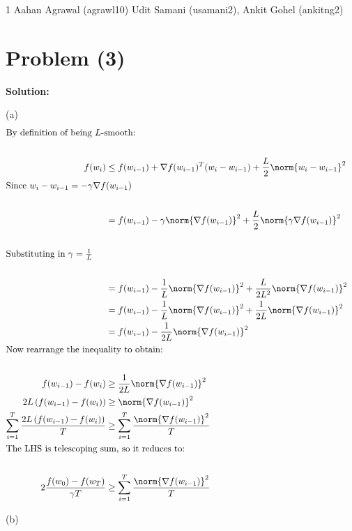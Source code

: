 \documentclass[../main.tex]{subfiles}
\begin{document}
\homework
    {1}
    {Aahan Agrawal (agrawl10)}
    {Udit Samani (usamani2), Ankit Gohel (ankitng2)}

\section*{Problem (3)}
\textbf{Solution:} 

(a) \\
\begin{align*}
    \intertext{By definition of being $L$-smooth:} \\
    f(w_i) &\leq f(w_{i-1}) + \nabla f(w_{i-1})^T(w_{i} - w_{i-1}) + \frac{L}{2}\norm{w_{i} - w_{i-1}}^2 \\
    \intertext{Since $w_{i} - w_{i-1} = -\gamma \nabla f(w_{i-1})$} \\
    &= f(w_{i-1}) - \gamma \norm{\nabla f(w_{i-1})}^2 + \frac{L}{2}\norm{\gamma \nabla f(w_{i-1})}^2 \\ \\
    \intertext{Substituting in $\gamma = \frac{1}{L}$} \\
    &= f(w_{i-1}) - \frac{1}{L} \norm{\nabla f(w_{i-1})}^2 + \frac{L}{2L^2}\norm{ \nabla f(w_{i-1})}^2 \\
    &= f(w_{i-1}) - \frac{1}{L} \norm{\nabla f(w_{i-1})}^2 + \frac{1}{2L}\norm{ \nabla f(w_{i-1})}^2 \\
    &= f(w_{i-1}) - \frac{1}{2L} \norm{\nabla f(w_{i-1})}^2 \\
    \intertext{Now rearrange the inequality to obtain:} \\
    f(w_{i-1}) - f(w_{i}) &\geq \frac{1}{2L} \norm{\nabla f(w_{i-1})}^2 \\
    2L\left(f(w_{i-1}) - f(w_{i})\right) &\geq  \norm{\nabla f(w_{i-1})}^2 \\
    \sum_{i=1}^{T}\frac{2L\left(f(w_{i-1}) - f(w_{i})\right)}{T} &\geq  \sum_{i=1}^{T} \frac{\norm{\nabla f(w_{i-1})}^2}{T} \\
    \intertext{The LHS is telescoping sum, so it reduces to:} \\
    2\frac{f(w_0) - f(w_T)}{\gamma T}&\geq  \sum_{i=1}^{T} \frac{\norm{\nabla f(w_{i-1})}^2}{T} \\
\end{align*}

(b) \\
\end{document}
